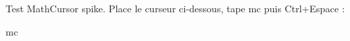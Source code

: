 \documentclass{article}
\begin{document}
Test MathCursor spike. Place le curseur ci-dessous, tape  mc  puis Ctrl+Espace :

mc
\end{document}
